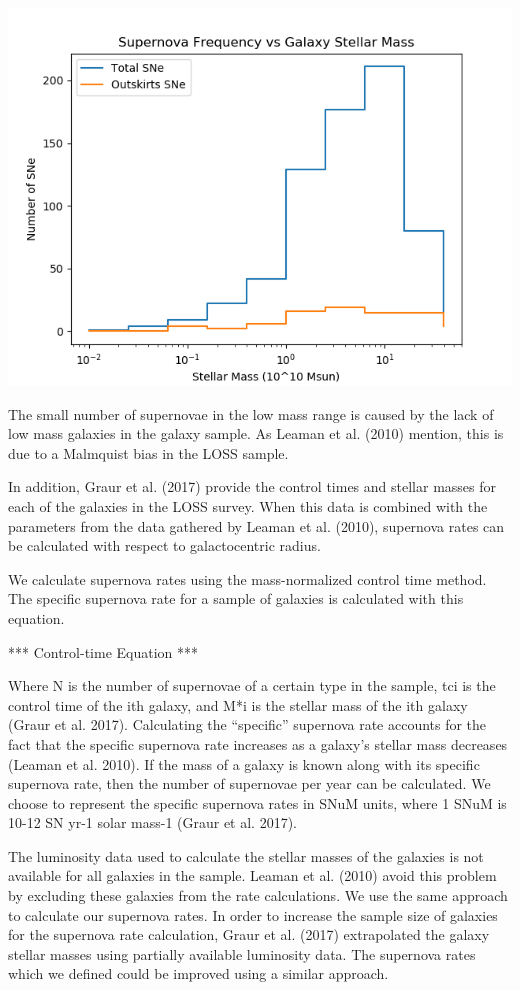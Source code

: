 \documentclass[apj]{emulateapj}
\begin{document}
\includegraphics[scale=0.5]{supernova_freq_vs_stellar_mass}

The small number of supernovae in the low mass range is caused by the lack of low mass galaxies in the galaxy sample. As Leaman et al. (2010) mention, this is due to a Malmquist bias in the LOSS sample.

In addition, Graur et al. (2017) provide the control times and stellar masses for each of the galaxies in the LOSS survey. When this data is combined with the parameters from the data gathered by Leaman et al. (2010), supernova rates can be calculated with respect to galactocentric radius.

We calculate supernova rates using the mass-normalized control time method. The specific supernova rate for a sample of galaxies is calculated with this equation.

*** Control-time Equation ***

Where N is the number of supernovae of a certain type in the sample, tci is the control time of the ith galaxy, and M*i is the stellar mass of the ith galaxy (Graur et al. 2017). Calculating the “specific” supernova rate accounts for the fact that the specific supernova rate increases as a galaxy’s stellar mass decreases (Leaman et al. 2010). If the mass of a galaxy is known along with its specific supernova rate, then the number of supernovae per year can be calculated. We choose to represent the specific supernova rates in SNuM units, where 1 SNuM is 10-12 SN yr-1 solar mass-1 (Graur et al. 2017).

The luminosity data used to calculate the stellar masses of the galaxies is not available for all galaxies in the sample. Leaman et al. (2010) avoid this problem by excluding these galaxies from the rate calculations. We use the same approach to calculate our supernova rates. In order to increase the sample size of galaxies for the supernova rate calculation, Graur et al. (2017) extrapolated the galaxy stellar masses using partially available luminosity data. The supernova rates which we defined could be improved using a similar approach.
\end{document}
